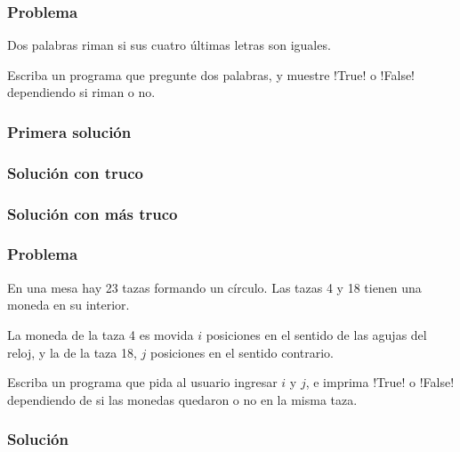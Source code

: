 \documentclass[12pt]{beamer}
\begin{document}
  \begin{frame}
    \label{problema-rimas}
    \frametitle{Problema}
    Dos palabras riman si sus cuatro últimas letras son iguales.

    Escriba un programa que pregunte dos palabras,
    y muestre \li!True! o \li!False! dependiendo si riman o no.

    
    
  \end{frame}

  \begin{frame}
    \label{rima1}
    \frametitle{Primera solución}
    
  \end{frame}

  \begin{frame}
    \label{rima2}
    \frametitle{Solución con truco}
    
  \end{frame}

  \begin{frame}
    \label{rima3}
    \frametitle{Solución con más truco}
    
  \end{frame}

  \begin{frame}
    \label{problema-tazas}
    \frametitle{Problema}
    En una mesa hay 23 tazas formando un círculo.
    Las tazas 4 y 18 tienen una moneda en su interior.

    La moneda de la taza 4 es movida
    \(i\) posiciones en el sentido de las agujas del reloj,
    y la de la taza 18, \(j\) posiciones en el sentido contrario.

    Escriba un programa que pida al usuario ingresar \(i\) y \(j\),
    e imprima \li!True! o \li!False! dependiendo de si las monedas
    quedaron o no en la misma taza.

    
  \end{frame}

  \begin{frame}
    \label{diagrama-tazas}
    \begin{center}
    \end{center}
  \end{frame}

  \begin{frame}
    \label{tazas}
    \frametitle{Solución}
    
  \end{frame}
\end{document}
